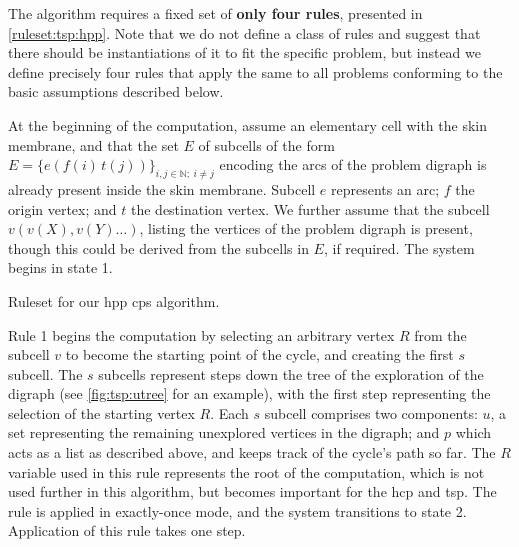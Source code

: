 The algorithm requires a fixed set of \textbf{only four rules}, presented in \cref{ruleset:tsp:hpp}.  Note that we do not define a class of rules and suggest that there should be instantiations of it to fit the specific problem, but instead we define precisely four rules that apply the same to all problems conforming to the basic assumptions described below.

At the beginning of the computation, assume an elementary cell with the skin membrane, and that the set \(E\) of subcells of the form \(E = \{e(f(i)\,t(j))\}_{i,j \in \mathbb{N}; ~ i \neq j}\) encoding the arcs of the problem digraph is already present inside the skin membrane.  Subcell \(e\) represents an arc; \(f\) the origin vertex; and \(t\) the destination vertex.  We further assume that the subcell \( v(v(X),v(Y)\dots)\), listing the vertices of the problem digraph is present, though this could be derived from the subcells in \(E\), if required.  The system begins in state 1.

\begin{cprulesetfloat}
    \begin{cpruleset}
        
        
        
    \end{cpruleset}
    \caption[Ruleset for the ]{\label{ruleset:tsp:hpp}Ruleset for our \gls{hpp} \gls{cps} algorithm.}
\end{cprulesetfloat}

Rule 1 begins the computation by selecting an arbitrary vertex \(R\) from the subcell \(v\) to become the starting point of the cycle, and creating the first \(s\) subcell.  The \(s\) subcells represent steps down the tree of the exploration of the digraph (see \cref{fig:tsp:utree} for an example), with the first step representing the selection of the starting vertex \(R\).  Each \(s\) subcell comprises two components: \(u\), a set representing the remaining unexplored vertices in the digraph; and \(p\) which acts as a list as described above, and keeps track of the cycle's path so far.  The \(R\) variable used in this rule represents the root of the computation, which is not used further in this algorithm, but becomes important for the \gls{hcp} and \gls{tsp}.  The rule is applied in exactly-once mode, and the system transitions to state 2.  Application of this rule takes one step.

